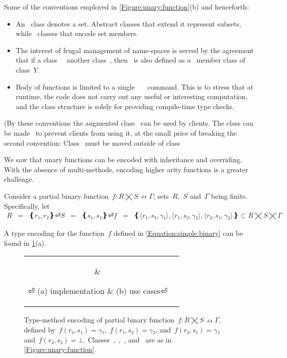 Some of the conventions employed in \cref{Figure:unary:function}(b) and henceforth:
\begin{itemize}
  \item An~ class denotes a set. Abstract classes that extend it represent
      subsets, while~ classes that encode set members.
  \item The interest of frugal management of name-spaces is served by the agreement that if
    a class~~ another class~, then~ is also defined
    as a~ member class of class~$Y$.
  \item Body of functions is limited to a single~~~\cc{;} command.
    This is to stress that at runtime, the code does not carry out any useful or interesting computation,
      and the class structure is solely for providing compile-time type checks.
\end{itemize}
(By these conventions the augmented class~ can be used by clients.
The class can be made~ to prevent clients from using it,
  at the small price of breaking the second convention:
  Class~ must be moved outside of class~

We saw that unary functions can be encoded with inheritance and overriding.
With the absence of multi-methods, encoding higher arity functions is a greater challenge.

Consider a partial binary function~$f: R⨉S↛Γ$; sets~$R$,~$S$ and~$Γ$ being finite.
Specifically, let
\begin{equation}
  \label{Equation:simple:binary}
  \begin{array}{rcl}
    R & = & ❴ r₁, r₂❵⏎
    S & = & ❴ s₁, s₂❵⏎
    f & = & ❴ ⟨r₁, s₁,γ₁⟩, ⟨r₁, s₂,γ₂⟩, ⟨r₂, s₁,γ₂⟩ ❵ ⊂ R⨉S⨉Γ
  \end{array}
\end{equation}

A \Java type encoding for the function~$f$ defined in \cref{Equation:simple:binary}
  can be found in \cref{Figure:simple:binary}(a).

\begin{figure}[hbt]
  \caption{\label{Figure:simple:binary}%
    Type-method encoding of partial binary function~$f: R⨉S↛Γ$,
  defined by~$f(r₁,s₁)=γ₁$,~$f(r₁,s₂)=γ₂$, and~$f(r₂,s₁)=γ₂$ and~$f(r₂, s₂) =⊥$.
  Classes~,~,~, and~ are as in \cref{Figure:unary:function}.}
  \begin{tabular}{cc}
   \parbox[c]{0.57\linewidth}{
   }
   &
   \hspace{-10ex}
   \parbox[c]{0.58\linewidth}{
   }
⏎
   \hspace{-7ex}(a) implementation & \hspace{-10ex}(b) use cases⏎
  \end{tabular}
\end{figure}

